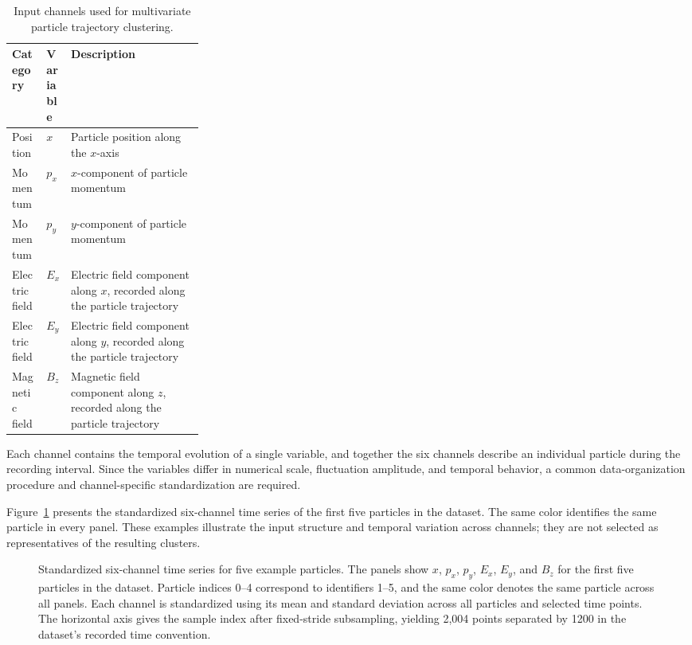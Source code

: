 \begin{table}[htbp]
\centering\small
\caption{Input channels used for multivariate particle trajectory clustering.}\label{tab:channels}
\begin{tabularx}{\linewidth}{@{}p{0.18\linewidth}p{0.1\linewidth}Y@{}}
\toprule
\textbf{Category} & \textbf{Variable} & \textbf{Description} \\
\midrule
Position & \(x\) & Particle position along the \(x\)-axis \\
Momentum & \(p_x\) & \(x\)-component of particle momentum \\
Momentum & \(p_y\) & \(y\)-component of particle momentum \\
Electric field & \(E_x\) & Electric field component along \(x\), recorded along the particle trajectory \\
Electric field & \(E_y\) & Electric field component along \(y\), recorded along the particle trajectory \\
Magnetic field & \(B_z\) & Magnetic field component along \(z\), recorded along the particle trajectory \\
\bottomrule
\end{tabularx}
\end{table}

Each channel contains the temporal evolution of a single variable, and together the six channels describe an individual particle during the recording interval. Since the variables differ in numerical scale, fluctuation amplitude, and temporal behavior, a common data-organization procedure and channel-specific standardization are required.

Figure~\ref{fig:time-series} presents the standardized six-channel time series of the first five particles in the dataset. The same color identifies the same particle in every panel. These examples illustrate the input structure and temporal variation across channels; they are not selected as representatives of the resulting clusters.

\begin{figure}[htbp]
\centering
{}
\caption[Standardized six-channel time series for five particles]{Standardized six-channel time series for five example particles. The panels show \(x\), \(p_x\), \(p_y\), \(E_x\), \(E_y\), and \(B_z\) for the first five particles in the dataset. Particle indices 0--4 correspond to identifiers 1--5, and the same color denotes the same particle across all panels. Each channel is standardized using its mean and standard deviation across all particles and selected time points. The horizontal axis gives the sample index after fixed-stride subsampling, yielding 2,004 points separated by 1200 in the dataset's recorded time convention.}\label{fig:time-series}
\end{figure}


